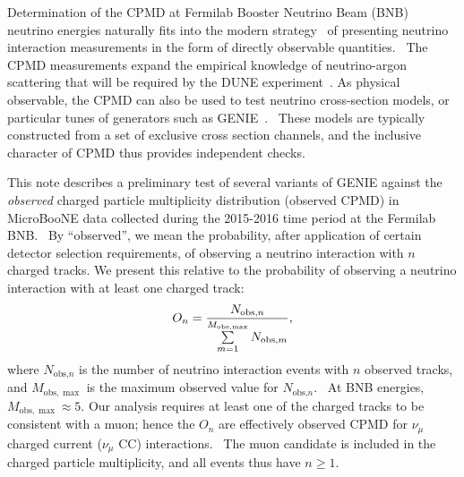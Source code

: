 \documentclass{article}
\begin{document}
Determination of the CPMD at Fermilab Booster Neutrino Beam (BNB)~\cite{BNB
reference} neutrino energies naturally fits into the modern strategy~\cite%
{Sam XC Review} of presenting neutrino interaction measurements in the form
of directly observable quantities. \ The CPMD measurements expand the
empirical knowledge of neutrino-argon scattering that will be required by
the DUNE experiment~\cite{DUNE reference}. As
physical observable, the CPMD can also be used to test neutrino cross-section models, or
particular tunes of generators such as GENIE~\cite{GENIE reference}. \ These
models are typically constructed from a set of exclusive cross section
channels, and the inclusive character of CPMD thus provides independent
checks.

This note describes a preliminary test of several variants of GENIE against
the \emph{observed} charged particle multiplicity distribution (observed
CPMD) in MicroBooNE data collected during the 2015-2016 time period at the
Fermilab BNB. \ By \textquotedblleft observed\textquotedblright , we mean
the probability, after application of certain detector selection
requirements, of observing a neutrino interaction with $n$ charged tracks. We present this relative to the probability of observing a neutrino interaction with at
least one charged track:%
\begin{equation}
O_{n}=\frac{N_{\text{obs,}n}}{\sum\limits_{m=1}^{M_{\text{obs},\max }}N_{%
\text{obs,}m}},
\end{equation}%
where $N_{\text{obs,}n}$ is the number of neutrino interaction events with $n
$ observed tracks, and $M_{\text{obs},\max }$ is the maximum observed value
for $N_{\text{obs,}n}$. \ At BNB energies, $M_{\text{obs},\max }\approx 5$.
Our analysis requires at least one of the charged tracks to be consistent
with a muon; hence the $O_{n}$ are effectively observed CPMD for $\nu _{\mu }
$ charged current ($\nu _{\mu }$ CC) interactions. \ The muon candidate is
included in the charged particle multiplicity, and all events thus have $%
n\geq 1$. \ 
\end{document}
